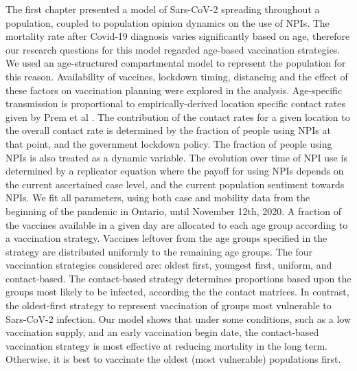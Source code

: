 The first chapter presented a model of Sars-CoV-2 spreading throughout a population, coupled to population opinion dynamics on the use of NPIs. The mortality rate after Covid-19 diagnosis varies significantly based on age, therefore our research questions for this model regarded age-based vaccination strategies. We used an age-structured compartmental model to represent the population for this reason. Availability of vaccines, lockdown timing, distancing and the effect of these factors on vaccination planning were explored in the analysis. Age-specific transmission is proportional to empirically-derived location specific contact rates given by Prem et al \cite{prem2020projecting}. The contribution of the contact rates for a given location to the overall contact rate is determined by the fraction of people using NPIs at that point, and the government lockdown policy. The fraction of people using NPIs is also treated as a dynamic variable. The evolution over time of NPI use is determined by a replicator equation where the payoff for using NPIs depends on the current ascertained case level, and the current population sentiment towards NPIs. We fit all parameters, using both case and mobility data from the beginning of the pandemic in Ontario, until November 12th, 2020. A fraction of the vaccines available in a given day are allocated to each age group according to a vaccination strategy. Vaccines leftover from the age groups specified in the strategy are distributed uniformly to the remaining age groups. The four vaccination strategies considered are: oldest first, youngest first, uniform, and contact-based. The contact-based strategy determines proportions based upon the groups most likely to be infected, according the the contact matrices. In contrast, the oldest-first strategy to represent vaccination of groups most vulnerable to Sars-CoV-2 infection. Our model shows that under some conditions, such as a low vaccination supply, and an early vaccination begin date, the contact-based vaccination strategy is most effective at reducing mortality in the long term. Otherwise, it is best to vaccinate the oldest (most vulnerable) populations first.


